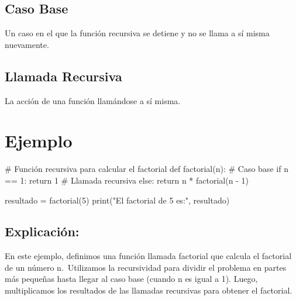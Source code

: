 \documentclass[
  a4paper,
  DIV=11,
  numbers=noendperiod,
  onepage,
  openany]{scrreprt}
\newenvironment{Shaded}{\begin{snugshade}}{\end{snugshade}}
\newcommand{\BuiltInTok}[1]{\textcolor[rgb]{0.00,0.23,0.31}{#1}}
\newcommand{\CommentTok}[1]{\textcolor[rgb]{0.37,0.37,0.37}{#1}}
\newcommand{\ControlFlowTok}[1]{\textcolor[rgb]{0.00,0.23,0.31}{#1}}
\newcommand{\DecValTok}[1]{\textcolor[rgb]{0.68,0.00,0.00}{#1}}
\newcommand{\KeywordTok}[1]{\textcolor[rgb]{0.00,0.23,0.31}{#1}}
\newcommand{\NormalTok}[1]{\textcolor[rgb]{0.00,0.23,0.31}{#1}}
\newcommand{\OperatorTok}[1]{\textcolor[rgb]{0.37,0.37,0.37}{#1}}
\newcommand{\StringTok}[1]{\textcolor[rgb]{0.13,0.47,0.30}{#1}}
\begin{document}
\subsection{Caso Base}\label{caso-base}

Un caso en el que la función recursiva se detiene y no se llama a sí
misma nuevamente.

\subsection{Llamada Recursiva}\label{llamada-recursiva}

La acción de una función llamándose a sí misma.

\section{Ejemplo}\label{ejemplo-16}

\begin{Shaded}
\begin{Highlighting}[]
\CommentTok{\# Función recursiva para calcular el factorial}
\KeywordTok{def}\NormalTok{ factorial(n):}
    \CommentTok{\# Caso base}
    \ControlFlowTok{if}\NormalTok{ n }\OperatorTok{==} \DecValTok{1}\NormalTok{:}
        \ControlFlowTok{return} \DecValTok{1}
    \CommentTok{\# Llamada recursiva}
    \ControlFlowTok{else}\NormalTok{:}
        \ControlFlowTok{return}\NormalTok{ n }\OperatorTok{*}\NormalTok{ factorial(n }\OperatorTok{{-}} \DecValTok{1}\NormalTok{)}

\NormalTok{resultado }\OperatorTok{=}\NormalTok{ factorial(}\DecValTok{5}\NormalTok{)}
\BuiltInTok{print}\NormalTok{(}\StringTok{"El factorial de 5 es:"}\NormalTok{, resultado)}
\end{Highlighting}
\end{Shaded}

\subsection{Explicación:}\label{explicaciuxf3n-34}

En este ejemplo, definimos una función llamada factorial que calcula el
factorial de un número n.~Utilizamos la recursividad para dividir el
problema en partes más pequeñas hasta llegar al caso base (cuando n es
igual a 1). Luego, multiplicamos los resultados de las llamadas
recursivas para obtener el factorial.
\end{document}
